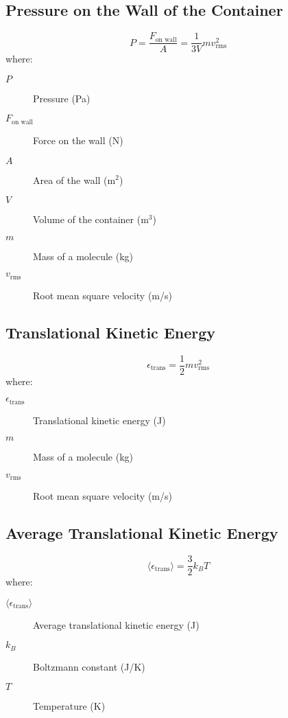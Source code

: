 \documentclass{article}
\begin{document}
\subsection*{Pressure on the Wall of the Container}
\begin{equation}
P = \frac{F_{\text{on wall}}}{A} = \frac{1}{3V} m v_{\text{rms}}^2
\end{equation}
where:
\begin{description}
    \item[$P$] Pressure (Pa)
    \item[$F_{\text{on wall}}$] Force on the wall (N)
    \item[$A$] Area of the wall (m\(^2\))
    \item[$V$] Volume of the container (m\(^3\))
    \item[$m$] Mass of a molecule (kg)
    \item[$v_{\text{rms}}$] Root mean square velocity (m/s)
\end{description}

\subsection*{Translational Kinetic Energy}
\begin{equation}
\epsilon_{\text{trans}} = \frac{1}{2} m v_{\text{rms}}^2
\end{equation}
where:
\begin{description}
    \item[$\epsilon_{\text{trans}}$] Translational kinetic energy (J)
    \item[$m$] Mass of a molecule (kg)
    \item[$v_{\text{rms}}$] Root mean square velocity (m/s)
\end{description}

\subsection*{Average Translational Kinetic Energy}
\begin{equation}
\langle \epsilon_{\text{trans}} \rangle = \frac{3}{2} k_B T
\end{equation}
where:
\begin{description}
    \item[$\langle \epsilon_{\text{trans}} \rangle$] Average translational kinetic energy (J)
    \item[$k_B$] Boltzmann constant (J/K)
    \item[$T$] Temperature (K)
\end{description}
\end{document}
